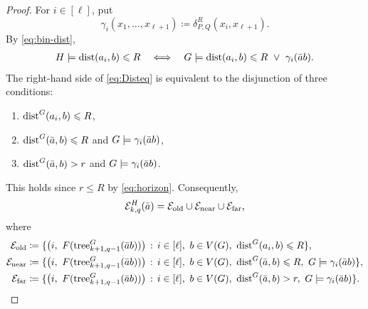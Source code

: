 \begin{proof}
For $i\in[\ell]$, put
\[
\gamma_i(x_1,\ldots,x_{\ell+1})\coloneqq\delta^R_{P,Q}(x_i,x_{\ell+1}).
\]
By \eqref{eq:bin-dist},
\begin{align}\label{eq:Disteq}
H\models\mathrm{dist}(a_i,b)\leqslant R
\quad\Longleftrightarrow\quad
G\models\mathrm{dist}(a_i,b)\leqslant R\ \lor\ \gamma_i(\bar a b).
   \end{align}
The right-hand side of \eqref{eq:Disteq}
is equivalent to the disjunction of three conditions:
\begin{enumerate}
   \item  $\mathrm{dist}^G(a_i,b)\leqslant R$,
   \item  $\mathrm{dist}^G(\bar a,b)\leqslant R$ and $G\models\gamma_i(\bar a b)$,
    \item  $\mathrm{dist}^G(\bar a,b)>r $ and $G\models\gamma_i(\bar a b)$.
\end{enumerate}
This holds since $r\le R$ by \eqref{eq:horizon}.
Consequently,
\[
\mathcal E^{H}_{k,q}(\bar a)=\mathcal E_{\mathrm{old}}\cup\mathcal E_{\mathrm{near}}\cup\mathcal E_{\mathrm{far}},
\]
where
\begin{align*}
\mathcal E_{\mathrm{old}}&\coloneqq\setof{\bigl(i,\ F(\tree^{G}_{k+1,q-1}(\tup a b))\bigr)}{i\in[\ell],\ b\in V(G),\ \dist^G(a_i,b)\le R},\\
\mathcal E_{\mathrm{near}}&\coloneqq\setof{\bigl(i,\ F(\tree^{G}_{k+1,q-1}(\tup a b))\bigr)}{i\in[\ell],\ b\in V(G),\ \dist^G(\tup a,b)\le R,\ G\models\gamma_i(\tup a b)},\\
\mathcal E_{\mathrm{far}}&\coloneqq\setof{\bigl(i,\ F(\tree^{G}_{k+1,q-1}(\tup a b))\bigr)}{i\in[\ell],\ b\in V(G),\ \dist^G(\tup a,b)>r,\ G\models\gamma_i(\tup a b)}.
\end{align*}


\end{proof}
